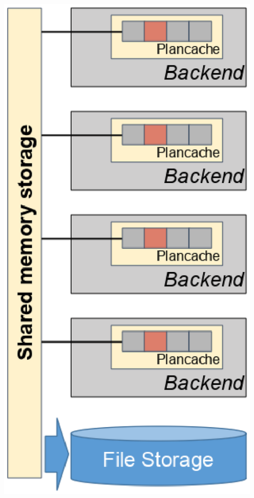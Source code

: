 \documentclass{beamer}
\begin{document}
\begin{frame}[fragile]
\begin{columns}
\begin{column}{0.5\textwidth}
\begin{center}
    \includegraphics[scale=0.4]{plancache_invalidation}
  \end{center}
\end{column}\end{columns}
\end{frame}
\end{document}
